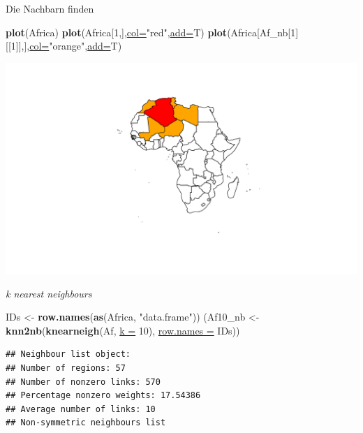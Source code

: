 \documentclass[ignorenonframetext,]{beamer}
\newenvironment{Shaded}{\begin{snugshade}}{\end{snugshade}}
\newcommand{\DataTypeTok}[1]{\textcolor[rgb]{0.74,0.68,0.62}{\underline{#1}}}
\newcommand{\DecValTok}[1]{\textcolor[rgb]{0.27,0.67,0.26}{#1}}
\newcommand{\KeywordTok}[1]{\textcolor[rgb]{0.26,0.66,0.93}{\textbf{#1}}}
\newcommand{\NormalTok}[1]{\textcolor[rgb]{0.74,0.68,0.62}{#1}}
\newcommand{\StringTok}[1]{\textcolor[rgb]{0.02,0.61,0.04}{#1}}
\begin{document}
\begin{frame}[fragile]{Die Nachbarn finden}
\protect\hypertarget{die-nachbarn-finden}{}

\begin{Shaded}
\begin{Highlighting}[]
\KeywordTok{plot}\NormalTok{(Africa)}
\KeywordTok{plot}\NormalTok{(Africa[}\DecValTok{1}\NormalTok{,],}\DataTypeTok{col=}\StringTok{"red"}\NormalTok{,}\DataTypeTok{add=}\NormalTok{T)}
\KeywordTok{plot}\NormalTok{(Africa[Af_nb[}\DecValTok{1}\NormalTok{][[}\DecValTok{1}\NormalTok{]],],}\DataTypeTok{col=}\StringTok{"orange"}\NormalTok{,}\DataTypeTok{add=}\NormalTok{T)}
\end{Highlighting}
\end{Shaded}

\includegraphics{A7_spdep_files/figure-beamer/unnamed-chunk-17-1.pdf}

\end{frame}

\begin{frame}[fragile]{\emph{k nearest neighbours}}
\protect\hypertarget{k-nearest-neighbours}{}

\begin{Shaded}
\begin{Highlighting}[]
\NormalTok{IDs <-}\StringTok{ }\KeywordTok{row.names}\NormalTok{(}\KeywordTok{as}\NormalTok{(Africa, }\StringTok{"data.frame"}\NormalTok{))}
\NormalTok{(Af10_nb <-}\StringTok{ }\KeywordTok{knn2nb}\NormalTok{(}\KeywordTok{knearneigh}\NormalTok{(Af, }\DataTypeTok{k =} \DecValTok{10}\NormalTok{), }\DataTypeTok{row.names =}\NormalTok{ IDs))}
\end{Highlighting}
\end{Shaded}

\begin{verbatim}
## Neighbour list object:
## Number of regions: 57 
## Number of nonzero links: 570 
## Percentage nonzero weights: 17.54386 
## Average number of links: 10 
## Non-symmetric neighbours list
\end{verbatim}

\end{frame}
\end{document}
